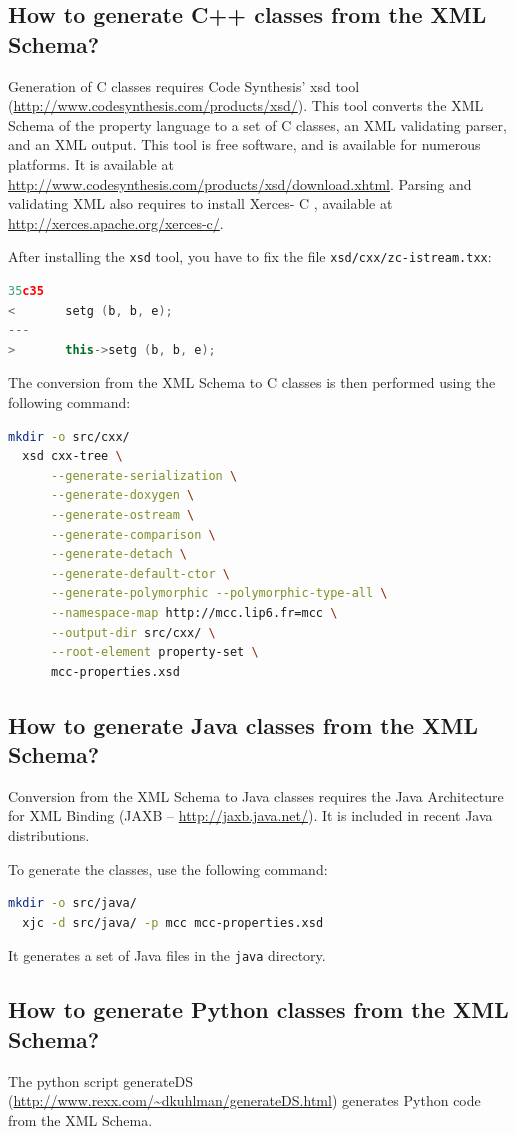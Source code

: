 \documentclass[10pt,english,a4paper]{article}
\newcommand{\CC}{%
  C\nolinebreak\hspace{-.05em}\raisebox{.4ex}{\scriptsize\bf +}\nolinebreak\hspace{-.10em}\raisebox{.4ex}{\scriptsize\bf +}%
}
\begin{document}
\subsection{How to generate C++ classes from the XML Schema?}
Generation of {\CC} classes requires Code Synthesis' xsd tool
(\url{http://www.codesynthesis.com/products/xsd/}).
This tool converts the XML Schema of the property language to a set of \CC{} classes,
an XML validating parser, and an XML output.
This tool is free software, and is available for numerous platforms.
It is available at \url{http://www.codesynthesis.com/products/xsd/download.xhtml}.
Parsing and validating XML also requires to install Xerces-\CC{},
available at \url{http://xerces.apache.org/xerces-c/}.

After installing the \lstinline!xsd! tool,
you have to fix the file \lstinline!xsd/cxx/zc-istream.txx!:
\begin{lstlisting}[language=C++]
35c35
<       setg (b, b, e);
---
>       this->setg (b, b, e);
\end{lstlisting}

The conversion from the XML Schema to \CC{} classes is then performed using the following command:
\begin{lstlisting}[language=sh]
  mkdir -o src/cxx/
  xsd cxx-tree \
      --generate-serialization \
      --generate-doxygen \
      --generate-ostream \
      --generate-comparison \
      --generate-detach \
      --generate-default-ctor \
      --generate-polymorphic --polymorphic-type-all \
      --namespace-map http://mcc.lip6.fr=mcc \
      --output-dir src/cxx/ \
      --root-element property-set \
      mcc-properties.xsd
\end{lstlisting}

\subsection{How to generate Java classes from the XML Schema?}
Conversion from the XML Schema to Java classes requires the Java Architecture for XML Binding
(JAXB -- \url{http://jaxb.java.net/}).
It is included in recent Java distributions.

To generate the classes, use the following command:
\begin{lstlisting}[language=sh]
  mkdir -o src/java/
  xjc -d src/java/ -p mcc mcc-properties.xsd
\end{lstlisting}
It generates a set of Java files in the \lstinline!java! directory.

\subsection{How to generate Python classes from the XML Schema?}
The python script generateDS (\url{http://www.rexx.com/~dkuhlman/generateDS.html}) generates Python code from the XML Schema.
\end{document}

